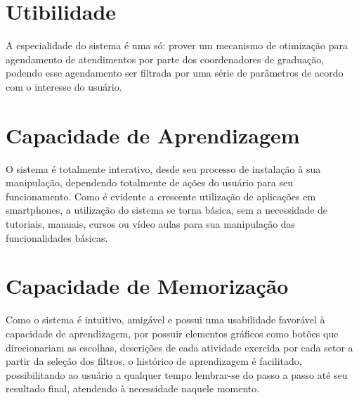	\section[Utibilidade]{Utibilidade}
	\label{sec:metasUsabilidade_eficiencia}

		A especialidade do sistema é uma só: prover um mecanismo de otimização para agendamento de atendimentos por parte dos coordenadores de graduação, podendo esse agendamento ser filtrada por uma série de parâmetros de acordo com o interesse do usuário.

	\section[Capacidade de Aprendizagem]{Capacidade de Aprendizagem}
	\label{sec:metasUsabilidade_aprendizagem}

		O sistema é totalmente interativo, desde seu processo de instalação à sua manipulação, dependendo totalmente de ações do usuário para seu funcionamento. Como é evidente a crescente utilização de aplicações em smartphones, a utilização do sistema se torna básica, sem a necessidade de tutoriais, manuais, cursos ou vídeo aulas para sua manipulação das funcionalidades básicas. 

	\section[Capacidade de Memorização]{Capacidade de Memorização}
	\label{sec:metasUsabilidade_memorizacao}

		Como o sistema é intuitivo, amigável e possui uma usabilidade favorável à capacidade de aprendizagem, por possuir elementos gráficos como botões que direcionariam as escolhas, descrições de cada atividade exercida por cada setor a partir da seleção dos filtros, o histórico de aprendizagem é facilitado, possibilitando ao usuário a qualquer tempo lembrar-se do passo a passo até seu resultado final, atendendo à necessidade naquele momento. 
